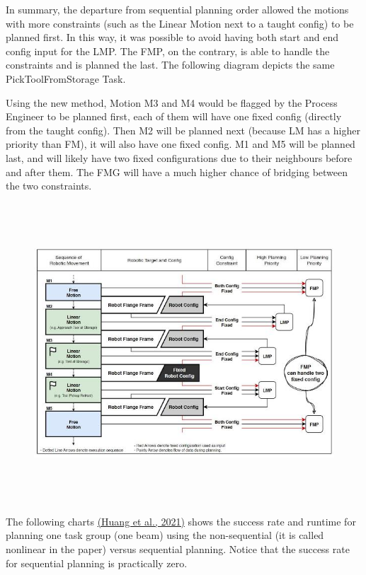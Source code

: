 \documentclass[11pt]{book}
\begin{document}
In summary, the departure from sequential planning order allowed the motions with more constraints (such as the Linear Motion next to a taught config) to be planned first. In this way, it was possible to avoid having both start and end config input for the LMP. The FMP, on the contrary, is able to handle the constraints and is planned the last. The following diagram depicts the same PickToolFromStorage Task. 

Using the new method, Motion M3 and M4 would be flagged by the Process Engineer to be planned first, each of them will have one fixed config (directly from the taught config). Then M2 will be planned next (because LM has a higher priority than FM), it will also have one fixed config. M1 and M5 will be planned last, and will likely have two fixed configurations due to their neighbours before and after them. The FMG will have a much higher chance of bridging between the two constraints. 

\begin{figure}[H]
\includegraphics[width=15.92cm,height=11.18cm]{./images/image63.jpeg}
\end{figure}


The following charts \href{https://www.zotero.org/google-docs/?LIhaZP}{(Huang et al., 2021)} shows the success rate and runtime for planning one task group (one beam) using the non-sequential (it is called nonlinear in the paper) versus sequential planning. Notice that the success rate for sequential planning is practically zero. 
\end{document}
